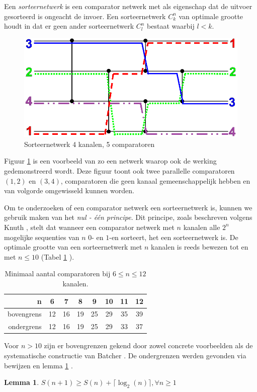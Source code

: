 \documentclass{article}
\newtheorem{lemma}{Lemma}
\begin{document}
Een \textit{sorteernetwerk} is een comparator netwerk met als eigenschap dat de uitvoer gesorteerd is ongeacht de invoer.
Een sorteernetwerk $C^n_k$ van optimale grootte houdt in dat er geen ander sorteernetwerk $C^n_l$ bestaat waarbij $l < k$. %
\begin{figure}[!h]
	\centering
	\includegraphics[scale=0.275]{NetworkTransparent.png} 
	\caption{Sorteernetwerk 4 kanalen, 5 comparatoren}
	\label{Werking}
\end{figure}
Figuur \ref{Werking} is een voorbeeld van zo een netwerk waarop ook de werking gedemonstreerd wordt.
Deze figuur toont ook twee parallelle comparatoren $(1,2)$ en $(3,4)$, comparatoren die geen kanaal gemeenschappelijk hebben en van volgorde omgewisseld kunnen worden.

Om te onderzoeken of een comparator netwerk een sorteernetwerk is, kunnen we gebruik maken van het \textit{nul - \'e\'en principe}. 
Dit principe, zoals beschreven volgens Knuth \cite{Knuth3}, stelt dat wanneer een comparator netwerk met $n$ kanalen alle $2^n$ mogelijke sequenties van $n$ $0$- en $1$-en sorteert, het een sorteernetwerk is.
De optimale grootte van een sorteernetwerk met $n$ kanalen is reeds bewezen tot en met $n \leq 10$ (Tabel \ref{tabel1} \cite{sortingNetworksSize2014}).
\begin{table}[h!]
	\centering
	\begin{tabular}{r|c|c|c|c|c|c|c}
	n & 6 & 7 & 8 & 9 & 10 & 11 & 12\\ 
	\hline 
	bovengrens & 12 & 16 & 19 & 25 & 29 & 35 & 39\\ 
	\hline 
	ondergrens & 12 & 16 & 19 & 25& 29 & 33 & 37\\
	\end{tabular} 
	\caption{Minimaal aantal comparatoren bij $6 \leq n \leq 12$ kanalen.}
	\label{tabel1}
\end{table}
Voor $n > 10$ zijn er bovengrenzen gekend door zowel concrete voorbeelden als de systematische constructie van Batcher \cite{sortingNetworksApplications}. 
De ondergrenzen werden gevonden via bewijzen en lemma \ref{lemma1} \cite{Voorhis1972}.
\begin{lemma}
	$S(n+1) \geq S(n) + \lceil \log_2(n) \rceil, \forall n \geq 1$
	\label{lemma1}
\end{lemma}
\end{document}
